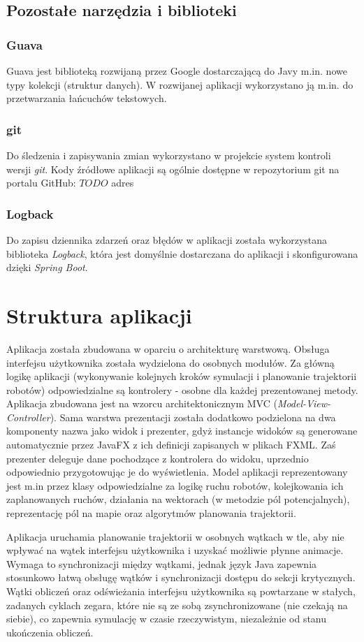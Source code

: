 \subsection{Pozostałe narzędzia i biblioteki}
\subsubsection{Guava}
Guava jest biblioteką rozwijaną przez Google dostarczającą do Javy m.in. nowe typy kolekcji (struktur danych). W rozwijanej aplikacji wykorzystano ją m.in. do przetwarzania łańcuchów tekstowych.
\subsubsection{git}
Do śledzenia i zapisywania zmian wykorzystano w projekcie system kontroli wersji {\it git}.
Kody źródłowe aplikacji są ogólnie dostępne w repozytorium git na portalu GitHub:
$TODO$ adres
\subsubsection{Logback}
Do zapisu dziennika zdarzeń oraz błędów w aplikacji została wykorzystana biblioteka {\it Logback}, która jest domyślnie dostarczana do aplikacji i skonfigurowana dzięki {\it Spring Boot}.


\section{Struktura aplikacji}
Aplikacja została zbudowana w oparciu o architekturę warstwową. Obsługa interfejsu użytkownika została wydzielona do osobnych modułów.
Za główną logikę aplikacji (wykonywanie kolejnych kroków symulacji i planowanie trajektorii robotów) odpowiedzialne są kontrolery - osobne dla każdej prezentowanej metody. Aplikacja zbudowana jest na wzorcu architektonicznym MVC ({\it Model-View-Controller}). Sama warstwa prezentacji została dodatkowo podzielona na dwa komponenty nazwa jako widok i prezenter, gdyż instancje widoków są generowane automatycznie przez JavaFX z ich definicji zapisanych w plikach FXML. Zaś prezenter deleguje dane pochodzące z kontrolera do widoku, uprzednio odpowiednio przygotowując je do wyświetlenia.
Model aplikacji reprezentowany jest m.in przez klasy odpowiedzialne za logikę ruchu robotów, kolejkowania ich zaplanowanych ruchów, działania na wektorach (w metodzie pól potencjalnych), reprezentację pól na mapie oraz algorytmów planowania trajektorii.

Aplikacja uruchamia planowanie trajektorii w osobnych wątkach w tle, aby nie wpływać na wątek interfejsu użytkownika i uzyskać możliwie płynne animacje. Wymaga to synchronizacji między wątkami, jednak język Java zapewnia stosunkowo łatwą obsługę wątków i synchronizacji dostępu do sekcji krytycznych. Wątki obliczeń oraz odświeżania interfejsu użytkownika są powtarzane w stałych, zadanych cyklach zegara, które nie są ze sobą zsynchronizowane (nie czekają na siebie), co zapewnia symulację w czasie rzeczywistym, niezależnie od stanu ukończenia obliczeń.

